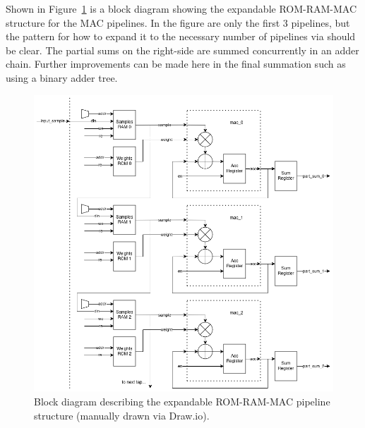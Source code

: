 \documentclass{article}
\begin{document}
    Shown in Figure~\ref{fig:RAM_ROM_MAC} is a block diagram showing the expandable ROM-RAM-MAC structure for the MAC pipelines.
    In the figure are only the first 3 pipelines, but the pattern for how to expand it to the necessary number of pipelines via should be clear.
    The partial sums on the right-side are summed concurrently in an adder chain.
    Further improvements can be made here in the final summation such as using a binary adder tree.
    \begin{figure}
        \centering
        \includegraphics[width=1.25\textwidth]{figures/RAM_ROM_MAC.png}
        \caption{
            Block diagram describing the expandable ROM-RAM-MAC pipeline structure (manually drawn via Draw.io).
        }
        \label{fig:RAM_ROM_MAC}
    \end{figure}
\end{document}

